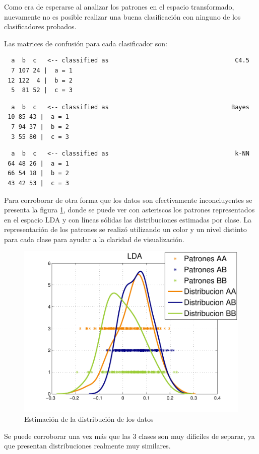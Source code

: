 \documentclass[12pt,a4paper,titlepage]{report}
\begin{document}
Como era de esperarse al analizar los patrones en el espacio transformado, nuevamente no es posible realizar una buena clasificación con ninguno de los clasificadores probados.

Las matrices de confusión para cada clasificador son:
\vspace{-10pt}
\begin{lstlisting}
  a  b  c   <-- classified as									C4.5
  7 107 24 |  a = 1
 12 122  4 |  b = 2
  5  81 52 |  c = 3
\end{lstlisting}
\vspace{-1cm}
\begin{lstlisting}
  a  b  c   <-- classified as								   Bayes
 10 85 43 |  a = 1
  7 94 37 |  b = 2
  3 55 80 |  c = 3
\end{lstlisting}
\vspace{-1cm}
\begin{lstlisting}
  a  b  c   <-- classified as									k-NN
 64 48 26 |  a = 1
 66 54 18 |  b = 2
 43 42 53 |  c = 3
\end{lstlisting}

Para corroborar de otra forma que los datos son efectivamente inconcluyentes se presenta la figura \ref{fig:lda_dist}, donde se puede ver con asteriscos los patrones representados en el espacio LDA y con líneas sólidas las distribuciones estimadas por clase. La representación de los patrones se realizó utilizando un color y un nivel distinto para cada clase para ayudar a la claridad de visualización.
\begin{figure}
	\centering
	\includegraphics[width=.8\textwidth]{pics/lda_dist.pdf}
	\caption{Estimación de la distribución de los datos}
	\label{fig:lda_dist}
\end{figure}
Se puede corroborar una vez más que las 3 clases son muy dificiles de separar, ya que presentan distribuciones realmente muy similares.
\end{document}
